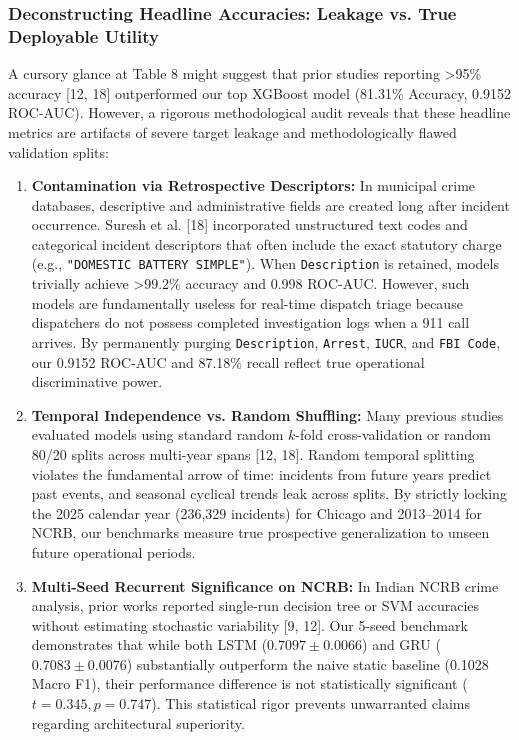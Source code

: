 \documentclass[runningheads]{llncs}
\begin{document}
\subsubsection{Deconstructing Headline Accuracies: Leakage vs. True Deployable Utility}
A cursory glance at Table 8 might suggest that prior studies reporting >95\% accuracy [12, 18] outperformed our top XGBoost model (81.31\% Accuracy, 0.9152 ROC-AUC). However, a rigorous methodological audit reveals that these headline metrics are artifacts of severe target leakage and methodologically flawed validation splits:
\begin{enumerate}
    \item \textbf{Contamination via Retrospective Descriptors:} In municipal crime databases, descriptive and administrative fields are created long after incident occurrence. Suresh et al. [18] incorporated unstructured text codes and categorical incident descriptors that often include the exact statutory charge (e.g., \texttt{"DOMESTIC BATTERY SIMPLE"}). When \texttt{Description} is retained, models trivially achieve >99.2\% accuracy and 0.998 ROC-AUC. However, such models are fundamentally useless for real-time dispatch triage because dispatchers do not possess completed investigation logs when a 911 call arrives. By permanently purging \texttt{Description}, \texttt{Arrest}, \texttt{IUCR}, and \texttt{FBI Code}, our 0.9152 ROC-AUC and 87.18\% recall reflect true operational discriminative power.
    \item \textbf{Temporal Independence vs. Random Shuffling:} Many previous studies evaluated models using standard random $k$-fold cross-validation or random 80/20 splits across multi-year spans [12, 18]. Random temporal splitting violates the fundamental arrow of time: incidents from future years predict past events, and seasonal cyclical trends leak across splits. By strictly locking the 2025 calendar year (236,329 incidents) for Chicago and 2013--2014 for NCRB, our benchmarks measure true prospective generalization to unseen future operational periods.
    \item \textbf{Multi-Seed Recurrent Significance on NCRB:} In Indian NCRB crime analysis, prior works reported single-run decision tree or SVM accuracies without estimating stochastic variability [9, 12]. Our 5-seed benchmark demonstrates that while both LSTM ($0.7097 \pm 0.0066$) and GRU ($0.7083 \pm 0.0076$) substantially outperform the naive static baseline (0.1028 Macro F1), their performance difference is not statistically significant ($t = 0.345, p = 0.747$). This statistical rigor prevents unwarranted claims regarding architectural superiority.
\end{enumerate}
\end{document}
